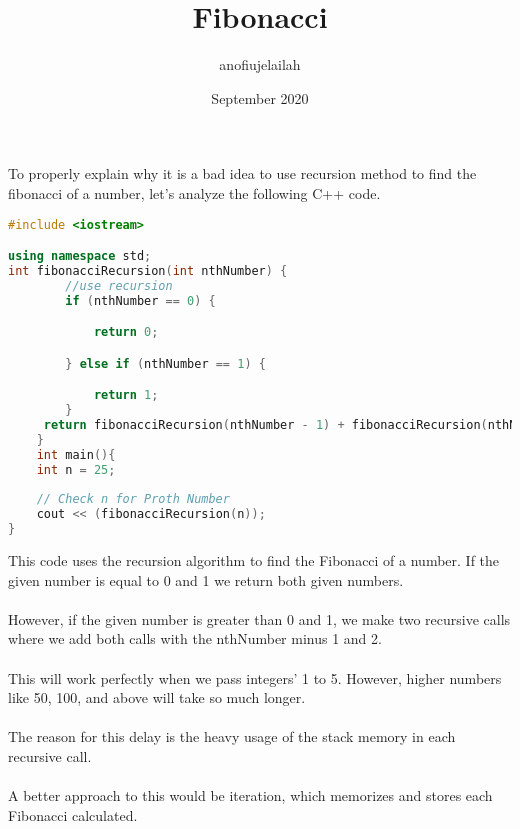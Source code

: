 \documentclass{article}
\title{Fibonacci}
\author{anofiujelailah }
\date{September 2020}
\begin{document}
\maketitle
To properly explain why it is a bad idea to use recursion method to find the fibonacci of a number, let's analyze the following C++ code.
\begin{lstlisting}[language=C++, caption=Recursion example]
#include <iostream>

using namespace std;
int fibonacciRecursion(int nthNumber) {
        //use recursion
        if (nthNumber == 0) {

            return 0;

        } else if (nthNumber == 1) {

            return 1;
        }   
     return fibonacciRecursion(nthNumber - 1) + fibonacciRecursion(nthNumber - 2);
    }
    int main(){
    int n = 25; 
  
    // Check n for Proth Number 
    cout << (fibonacciRecursion(n));
}
\end{lstlisting}
This code uses the recursion algorithm to find the Fibonacci of a number. If the given number is equal to 0 and 1 we return both given numbers.\\\\
However, if the given number is greater than 0 and 1, we make two recursive calls where we add both calls with the nthNumber minus 1 and 2.\\\\
This will work perfectly when we pass integers' 1 to 5. However, higher numbers like 50, 100, and above will take so much longer. \\\\
The reason for this delay is the heavy usage of the stack memory in each recursive call.\\\\
A better approach to this would be iteration, which memorizes and stores each Fibonacci calculated.
\end{document}

